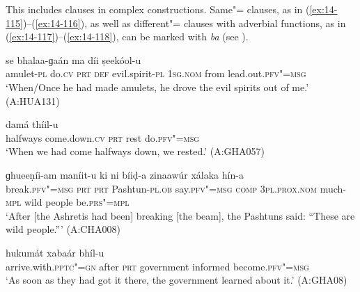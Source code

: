 This includes clauses in complex constructions. Same"= clauses, as in (\ref{ex:14-115})--(\ref{ex:14-116}), as well as different"= clauses with adverbial functions, as in (\ref{ex:14-117})--(\ref{ex:14-118}), can be marked with \textit{ba} (see ).

\begin{exe}
\ex
\label{ex:14-115}
 se bhalaa-ɡaán ma  díi ṣeekóol-u \\
amulet-\textsc{pl} do.\textsc{cv} \textsc{prt} \textsc{def} evil.spirit-\textsc{pl} \textsc{1sg.nom} from lead.out.\textsc{pfv"=msg}{\protect\footnotemark} \\
\glt `When/Once he had made amulets, he drove the evil spirits out of me.' (A:HUA131)

\ex
\label{ex:14-116}
 damá thíil-u \\
halfways come.down.\textsc{cv} \textsc{prt} rest do.\textsc{pfv"=msg } \\
\glt `When we had come halfways down, we rested.' (A:GHA057)

\ex
\label{ex:14-117}
\gll [phooṭóol-u ta ba] ɡhueeṇíi-am maníit-u  ki ni bíiḍ-a zinaawúr
xálaka  hín-a \\
break.\textsc{pfv"=msg} \textsc{prt} \textsc{prt} Pashtun-\textsc{pl.ob} say.\textsc{pfv"=msg}  \textsc{comp} \textsc{3pl.prox.nom} much-\textsc{mpl} wild people be.\textsc{prs"=mpl } \\
\glt `After [the Ashretis had been] breaking [the beam], the Pashtuns said: ``These are wild people.''' (A:CHA008)

\ex
\label{ex:14-118}
\gll [phedóol"=ii pahúrta ba] hukumát xabaár  bhíl-u \\
arrive.with.\textsc{pptc"=gn} after \textsc{prt} government informed become.\textsc{pfv"=msg}\\
\glt `As soon as they had got it there, the government learned about it.' (A:GHA08)
\end{exe}


